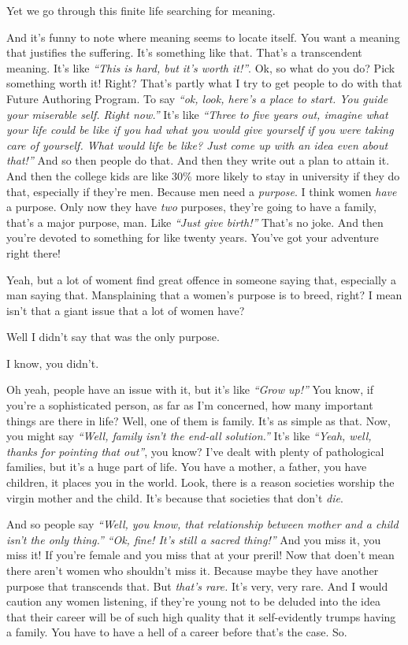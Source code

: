\documentclass{memoir}
\newcommand{\qq}[1]{\emph{“#1”}}
\begin{document}
\begin{drama}
		\jrspeaks Yet we go through this finite life searching for meaning.

		\jpspeaks And it's funny to note where meaning seems to locate itself. You want a meaning that justifies the suffering. It's something like that. That's a transcendent meaning. It's like \qq{This is hard, but it's worth it!}. Ok, so what do you do? Pick something worth it! Right? That's partly what I try to get people to do with that Future Authoring Program. To say \qq{ok, look, here's a place to start. You guide your miserable self. Right now.} It's like \qq{Three to five years out, imagine what your life could be like if you had what you would give yourself if you were taking care of yourself. What would life be like? Just come up with an idea even about that!} And so then people do that. And then they write out a plan to attain it. And then the college kids are like 30\% more likely to stay in university if they do that, especially if they're men. Because men need a \emph{purpose}. I think women \emph{have} a purpose. Only now they have \emph{two} purposes, they're going to have a family, that's a major purpose, man. Like \qq{Just give birth!} That's no joke. And then you're devoted to something for like twenty years. You've got your adventure right there!

		\jrspeaks Yeah, but a lot of woment find great offence in someone saying that, especially a man saying that. Mansplaining that a women's purpose is to breed, right? I mean isn't that a giant issue that a lot of women have?

		\jpspeaks Well I didn't say that was the only purpose.

		\jrspeaks I know, you didn't.

		\jpspeaks Oh yeah, people have an issue with it, but it's like \qq{Grow up!} You know, if you're a sophisticated person, as far as I'm concerned, how many important things are there in life? Well, one of them is family. It's as simple as that. Now, you might say \qq{Well, family isn't the end-all solution.} It's like \qq{Yeah, well, thanks for pointing that out}, you know? I've dealt with plenty of pathological families, but it's a huge part of life. You have a mother, a father, you have children, it places you in the world. Look, there is a reason societies worship the virgin mother and the child. It's because that societies that don't \emph{die}.

		And so people say \qq{Well, you know, that relationship between mother and a child isn't the only thing.} \qq{Ok, fine! It's still a sacred thing!} And you miss it, you miss it! If you're female and you miss that at your preril! Now that doen't mean there aren't women who shouldn't miss it. Because maybe they have another purpose that transcends that. But \emph{that's rare.} It's very, very rare. And I would caution any women listening, if they're young not to be deluded into the idea that their career will be of such high quality that it self-evidently trumps having a family. You have to have a hell of a career before that's the case. So.


\end{drama}
\end{document}
